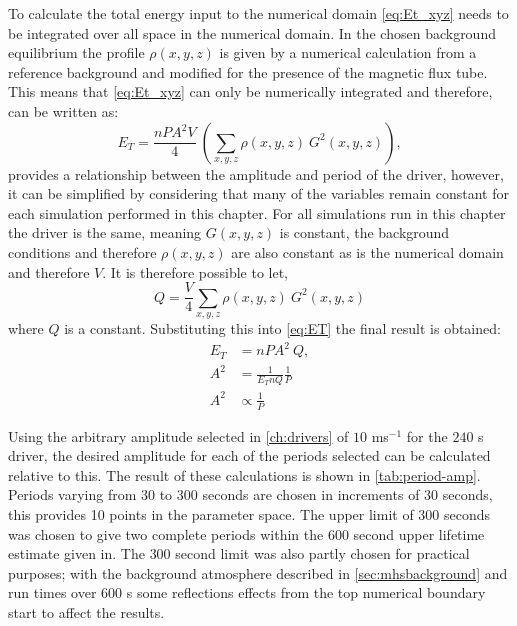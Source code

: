 \documentclass[a4paper,12pt,fourier,authoryear,custommargin]{Classes/PhDThesisPSnPDF}
\providecommand{\DIFaddtex}[1]{{\protect\color{blue}\uwave{#1}}} %
\providecommand{\DIFaddbegin}{} %
\providecommand{\DIFaddend}{} %
\providecommand{\DIFadd}[1]{\texorpdfstring{\DIFaddtex{#1}}{#1}} %
\begin{document}
To calculate the total energy input to the numerical domain \cref{eq:Et_xyz} needs to be integrated over all space in the numerical domain.
In the chosen background equilibrium the profile $\rho(x,y,z)$ is given by a numerical calculation from a reference background and modified for the presence of the magnetic flux tube.
This means that \cref{eq:Et_xyz} can only be numerically integrated and therefore, can be written as:
\begin{equation}
    E_T = \frac{nPA^2V}{4}\ \left( \sum_{x,y,z} \rho(x,y,z)\ G^2(x,y,z) \right),\label{eq:ET}
\end{equation}
 provides a relationship between the amplitude and period of the driver, however, it can be simplified by considering that many of the variables remain constant for each simulation performed in this chapter.
For all simulations run in this chapter the driver is the same, meaning $G(x,y,z)$ is constant, the background conditions and therefore $\rho(x,y,z)$ are also constant as is the numerical domain and therefore $V$.
It is therefore possible to let,
\begin{equation}
    Q = \frac{V}{4} \sum_{x,y,z} \rho(x,y,z)\ G^2(x,y,z)
\end{equation}
where $Q$ is a constant.
Substituting this into \cref{eq:ET} the final result is obtained:
\begin{align}
    E_T &= nPA^2\ Q, \\
    A^2 &= \frac{1}{E_T n Q} \frac{1}{P} \\
    A^2 &\propto \frac{1}{P}
\end{align}

Using the arbitrary amplitude selected in \cref{ch:drivers} of $10$ ms$^{-1}$ for the $240$ s driver, the desired amplitude for each of the periods selected can be calculated relative to this.
The result of these calculations is shown in \cref{tab:period-amp}.
Periods varying from $30$ to $300$ seconds are chosen in increments of $30$ seconds, this provides 10 points in the parameter space.
The upper limit of $300$ seconds was chosen to give two complete periods within the $600$ second upper lifetime estimate given in\DIFaddbegin \DIFadd{~}\DIFaddend \cite{sanchezalmeida2004}.
The $300$ second limit was also partly chosen for practical purposes; with the background atmosphere described in \cref{sec:mhsbackground} and run times over $600$ s some reflections effects from the top numerical boundary start to affect the results.
\end{document}
